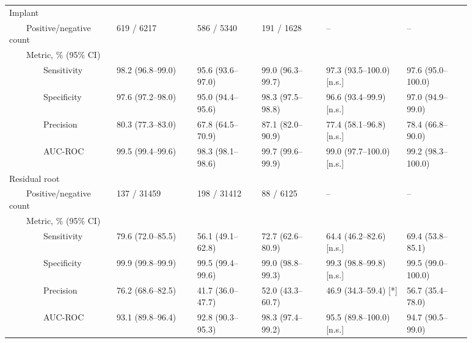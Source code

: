 \begin{table}[!h]
\begin{tabular}{ p{0.2\linewidth}p{0.15\linewidth}p{0.125\linewidth}p{0.125\linewidth}|p{0.15\linewidth}p{0.125\linewidth} }
Implant &   &   &   &   &   \\
{~~~~}Positive/negative count & \num{619} / \num{6217} & \num{586} / \num{5340} & \num{191} / \num{1628} & -- & -- \\
{~~~~}Metric, \% (95\% CI) &   &   &   &   &   \\
{~~~~~~~~}Sensitivity & 98.2 {(96.8--99.0)} & 95.6 {(93.6--97.0)} & 99.0 {(96.3--99.7)} & 97.3 (93.5--100.0) [n.s.] & 97.6 (95.0--100.0) \\
{~~~~~~~~}Specificity & 97.6 {(97.2--98.0)} & 95.0 {(94.4--95.6)} & 98.3 {(97.5--98.8)} & 96.6 (93.4--99.9) [n.s.] & 97.0 (94.9--99.0) \\
{~~~~~~~~}Precision & 80.3 {(77.3--83.0)} & 67.8 {(64.5--70.9)} & 87.1 {(82.0--90.9)} & 77.4 (58.1--96.8) [n.s.] & 78.4 (66.8--90.0) \\
{~~~~~~~~}AUC-ROC & 99.5 {(99.4--99.6)} & 98.3 {(98.1--98.6)} & 99.7 {(99.6--99.9)} & 99.0 (97.7--100.0) [n.s.] & 99.2 (98.3--100.0) \\ \midrule

Residual root &   &   &   &   &   \\
{~~~~}Positive/negative count & \num{137} / \num{31459} & \num{198} / \num{31412} & \num{88} / \num{6125} & -- & -- \\
{~~~~}Metric, \% (95\% CI) &   &   &   &   &   \\
{~~~~~~~~}Sensitivity & 79.6 {(72.0--85.5)} & 56.1 {(49.1--62.8)} & 72.7 {(62.6--80.9)} & 64.4 (46.2--82.6) [n.s.] & 69.4 (53.8--85.1) \\
{~~~~~~~~}Specificity & 99.9 {(99.8--99.9)} & 99.5 {(99.4--99.6)} & 99.0 {(98.8--99.3)} & 99.3 (98.8--99.8) [n.s.] & 99.5 (99.0--100.0) \\
{~~~~~~~~}Precision & 76.2 {(68.6--82.5)} & 41.7 {(36.0--47.7)} & 52.0 {(43.3--60.7)} & 46.9 (34.3--59.4) [*] & 56.7 (35.4--78.0) \\
{~~~~~~~~}AUC-ROC & 93.1 {(89.8--96.4)} & 92.8 {(90.3--95.3)} & 98.3 {(97.4--99.2)} & 95.5 (89.8--100.0) [n.s.] & 94.7 (90.5--99.0) \\ \midrule


\end{tabular}
\end{table}
